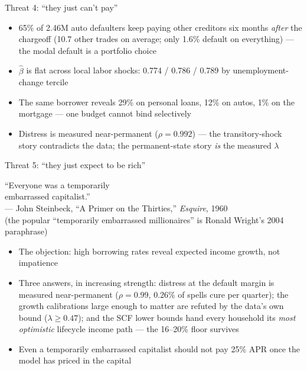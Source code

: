 \documentclass[11pt,aspectratio=169]{beamer}
\newenvironment{wideitemize}{\begin{itemize}\setlength{\itemsep}{0.7em}}{\end{itemize}}
\newcommand{\goto}[2]{\hyperlink{#1}{\beamergotobutton{#2}}}
\newcommand{\buttonrow}[1]{\vspace{0.3em}\hfill #1}
\begin{document}
\begin{frame}[label=threat_liq]{Threat 4: ``they just can't pay''}
\begin{wideitemize}
  \item \alert{65\% of 2.46M auto defaulters keep paying other creditors}
        six months \emph{after} the chargeoff (10.7 other trades on
        average; only 1.6\% default on everything) --- the modal default is
        a portfolio choice
  \item $\widehat\beta$ is \alert{flat across local labor shocks}:
        0.774 / 0.786 / 0.789 by unemployment-change tercile
  \item The same borrower reveals 29\% on personal loans, 12\% on autos,
        1\% on the mortgage --- \alert{one budget cannot bind selectively}
  \item Distress is measured near-permanent ($\rho = 0.992$) --- the
        transitory-shock story contradicts the data; the permanent-state
        story \emph{is} the measured $\lambda$
\end{wideitemize}
\buttonrow{\goto{b_liq}{Monte Carlo: why $\widehat\beta$ can't acquit itself}}
\end{frame}

\begin{frame}[label=threat_rich]{Threat 5: ``they just expect to be rich''}
\begin{center}
\Large ``Everyone was a temporarily\\[0.2em] embarrassed capitalist.''\\[0.9em]
\normalsize --- John Steinbeck, ``A Primer on the Thirties,'' \emph{Esquire}, 1960\\[0.3em]
{\footnotesize (the popular ``temporarily embarrassed millionaires'' is Ronald Wright's 2004 paraphrase)}
\end{center}
\vspace{0.6em}
\begin{wideitemize}
  \item The objection: high borrowing rates reveal expected income growth,
        not impatience
  \item Three answers, in increasing strength: distress at the default
        margin is measured near-permanent ($\rho = 0.99$, 0.26\% of
        spells cure per quarter); the growth calibrations large enough to
        matter are refuted by the data's own bound ($\lambda \ge 0.47$);
        and the SCF lower bounds hand every household its \emph{most
        optimistic} lifecycle income path --- the 16--20\% floor survives
  \item Even a temporarily embarrassed capitalist should not pay 25\%
        APR once the model has priced in the capital
\end{wideitemize}
\end{frame}
\end{document}
